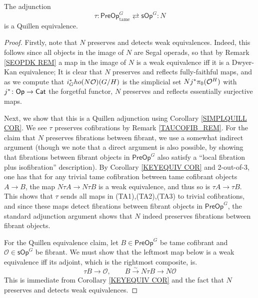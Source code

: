 \documentclass[a4paper,10pt
,draft
]{article}%
\renewcommand{\1}{\eta}%
\begin{document}
\begin{proposition}\label{PREQUIEQUIV PROP}
The adjunction
\[
	\tau \colon \mathsf{PreOp}^G_{\text{tame}}
		\rightleftarrows 
	\mathsf{sOp}^G \colon N
\]
is a Quillen equivalence.
\end{proposition}


\begin{proof}
Firstly, note that $N$ preserves and detects weak equivalences.
Indeed, this follows since all objects in the image of $N$ are Segal operads, so that by Remark \ref{SEOPDK REM} a map in the image of $N$ is a weak equivalence iff it is a Dwyer-Kan equivalence;
It is clear that $N$ preserves and reflects fully-faithful maps,
and as we compute that $i_G^{\**}ho(N\O)(G/H)$ is the simplicial set $N j^{\**}\pi_0(\O^H)$
with $j^{\**}\colon \Op \to \Cat$ the forgetful functor,
$N$ preserves and reflects essentially surjective maps.

Next, we show that this is a Quillen adjunction using Corollary \ref{SIMPLQUILL COR}.
We see $\tau$ preserves cofibrations by Remark \ref{TAUCOFIB_REM}.
For the claim that $N$ preserves fibrations between fibrant,
we use a somewhat indirect argument
(though we note that a direct argument is also possible,
by showing that fibrations between fibrant objects in $\mathsf{PreOp}^G$
also satisfy a ``local fibration plus isofibration'' description).
By Corollary \ref{KEYEQUIV COR} and 2-out-of-3, 
one has that for any trivial tame cofibration between tame cofibrant objects
$A \to B$, the map $N \tau A \to N \tau B$ is a weak equivalence, and thus so is $\tau A \to \tau B$.
This shows that $\tau$ sends all maps in (TA1),(TA2),(TA3)
to trivial cofibrations, and since these maps detect fibrations between fibrant objects in $\mathsf{PreOp}^G$, 
the standard adjunction argument shows that 
$N$ indeed preserves fibrations between fibrant objects.

For the Quillen equivalence claim, 
let $B \in \mathsf{PreOp}^G$ be tame cofibrant and
$\mathcal{O} \in \mathsf{sOp}^G$ be fibrant.
We must show that the leftmost map below is a weak equivalence iff its adjoint, which is the rightmost composite, is.
\[
	\tau B \to \mathcal{O},
\qquad
	B \xrightarrow{\sim} N \tau B \to N \mathcal{O}
\]
This is immediate from Corollary \ref{KEYEQUIV COR}
and the fact that $N$ preserves and detects weak equivalences.
\end{proof}
\end{document}
